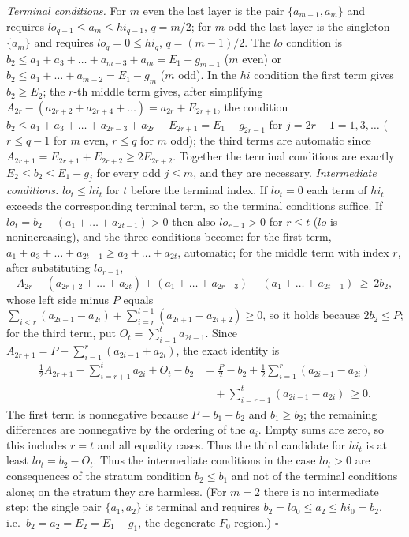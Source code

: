 \documentclass[
  11pt,
  a4paper,
]{article}
\begin{document}
\emph{Terminal conditions.} For \(m\) even the last layer is the pair
\(\{a_{m-1},\allowbreak{}a_m\}\) and requires \(lo_{q-1}\le a_m\le hi_{q-1}\),
\(q=m/2\); for \(m\) odd the last layer is the singleton \(\{a_m\}\) and
requires \(lo_q=0\le hi_q\), \(q=(m-1)/2\). The \(lo\) condition is
\(b_2\le a_1+a_3+\dots+a_{m-3}+a_m=E_1-g_{m-1}\) (\(m\) even) or
\(b_2\le a_1+\dots+a_{m-2}=E_1-g_m\) (\(m\) odd). In the \(hi\)
condition the first term gives \(b_2\ge E_2\); the \(r\)-th middle term
gives, after simplifying
\(A_{2r}-(a_{2r+2}+a_{2r+4}+\dots)=a_{2r}+E_{2r+1}\), the condition
\(b_2\le a_1+a_3+\dots+a_{2r-3}+a_{2r}+E_{2r+1}=E_1-g_{2r-1}\) for
\(j=2r-1=1,\allowbreak{}3,\allowbreak{}\dots\) (\(r\le q-1\) for \(m\) even, \(r\le q\) for \(m\)
odd); the third terms are automatic since
\(A_{2r+1}=E_{2r+1}+E_{2r+2}\ge2E_{2r+2}\). Together the terminal
conditions are exactly \(E_2\le b_2\le E_1-g_j\) for every odd
\(j\le m\), and they are necessary. \emph{Intermediate conditions.}
\(lo_t\le hi_t\) for \(t\) before the terminal index. If \(lo_t=0\) each
term of \(hi_t\) exceeds the corresponding terminal term, so the
terminal conditions suffice. If \(lo_t=b_2-(a_1+\dots+a_{2t-1})>0\) then
also \(lo_{r-1}>0\) for \(r\le t\) (\(lo\) is nonincreasing), and the
three conditions become: for the first term,
\(a_1+a_3+\dots+a_{2t-1}\ge a_2+\dots+a_{2t}\), automatic; for the
middle term with index \(r\), after substituting \(lo_{r-1}\),
\[A_{2r}-(a_{2r+2}+\dots+a_{2t})+(a_1+\dots+a_{2r-3})+(a_1+\dots+a_{2t-1})\ \ge\ 2b_2,\]
whose left side minus \(P\) equals
\(\sum_{i<r}(a_{2i-1}-a_{2i})+\sum_{i=r}^{t-1}(a_{2i+1}-a_{2i+2})\ge0\),
so it holds because \(2b_2\le P\); for the third term, put
\(O_t=\sum_{i=1}^t a_{2i-1}\). Since
\(A_{2r+1}=P-\sum_{i=1}^r(a_{2i-1}+a_{2i})\), the exact identity is
\[\begin{aligned}
\frac12A_{2r+1}-\sum_{i=r+1}^t a_{2i}+O_t-b_2
&=\frac P2-b_2+\frac12\sum_{i=1}^r(a_{2i-1}-a_{2i})\\
&\quad+\sum_{i=r+1}^t(a_{2i-1}-a_{2i})\ \ge0.
\end{aligned}\] The first term is nonnegative because \(P=b_1+b_2\) and
\(b_1\ge b_2\); the remaining differences are nonnegative by the
ordering of the \(a_i\). Empty sums are zero, so this includes \(r=t\)
and all equality cases. Thus the third candidate for \(hi_t\) is at
least \(lo_t=b_2-O_t\). Thus the intermediate conditions in the case
\(lo_t>0\) are consequences of the stratum condition \(b_2\le b_1\) and
not of the terminal conditions alone; on the stratum they are harmless.
(For \(m=2\) there is no intermediate step: the single pair
\(\{a_1,\allowbreak{}a_2\}\) is terminal and requires
\(b_2=lo_0\le a_2\le hi_0=b_2\), i.e.~\(b_2=a_2=E_2=E_1-g_1\), the
degenerate \(F_0\) region.) \(\square\)
\end{document}

